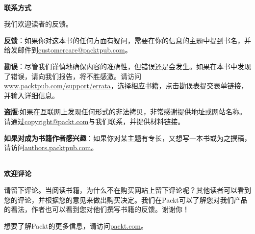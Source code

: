 \hspace*{\fill} \\ %
\textbf{联系方式}

我们欢迎读者的反馈。

\textbf{反馈}：如果你对这本书的任何方面有疑问，需要在你的信息的主题中提到书名，并给发邮件到\url{customercare@packtpub.com}。

\textbf{勘误}：尽管我们谨慎地确保内容的准确性，但错误还是会发生。如果在本书中发现了错误，请向我们报告，将不胜感激。请访问\url{www.packtpub.com/support/errata}，选择相应书籍，点击勘误表提交表单链接，并输入详细信息。

\textbf{盗版}:如果在互联网上发现任何形式的非法拷贝，非常感谢提供地址或网站名称。请通过\url{copyright@packt.com}与我们联系，并提供材料链接。

\textbf{如果对成为书籍作者感兴趣}：如果你对某主题有专长，又想写一本书或为之撰稿，请访问\url{authors.packtpub.com}。

\hspace*{\fill} \\ %
\textbf{欢迎评论}

请留下评论。当阅读书籍，为什么不在购买网站上留下评论呢？其他读者可以看到您的评论，并根据您的意见来做出购买决定。我们在Packt可以了解您对我们产品的看法，作者也可以看到您对他们撰写书籍的反馈。谢谢你！

想要了解Packt的更多信息，请访问\url{packt.com}。










